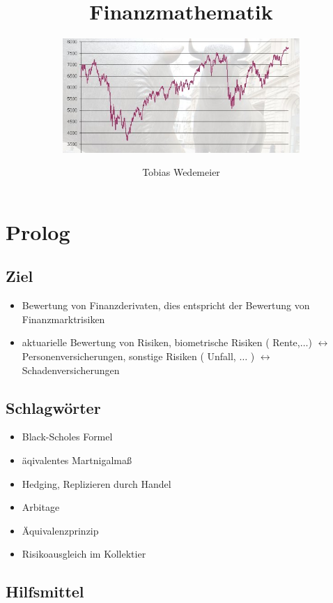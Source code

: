 \documentclass[a4paper, pagesize=pdftex, pdftex, twoside, headsepline, index=totoc,toc=listof, fontsize=10pt, cleardoublepage=empty, headinclude, DIV=13, BCOR=13mm]{scrartcl}
\author{Tobias Wedemeier}
\title{Finanzmathematik}
\subtitle{\includegraphics[width=9cm]{Bilder/boerse.jpg}}
\begin{document}
\maketitle
\thispagestyle{empty}
\newpage


\tableofcontents
\cleardoubleoddemptypage %

\setcounter{page}{1}

\section*{Prolog}  %
\label{sec:prolog}

\subsection*{Ziel} %
\label{sub:ziel}

\begin{itemize}
	\item Bewertung von Finanzderivaten, dies entspricht der Bewertung von Finanzmarktrisiken
	\item aktuarielle Bewertung von Risiken, biometrische Risiken ( Rente,$\dots$) $\leftrightarrow$ Personenversicherungen,
		sonstige Risiken ( Unfall, $\dots$ ) $\leftrightarrow$ Schadenversicherungen
\end{itemize}

\subsection*{Schlagwörter} %
\label{sub: schlagwörter}

\begin{itemize}
	\item Black-Scholes Formel
	\item äqivalentes Martnigalmaß
	\item Hedging, Replizieren durch Handel
	\item Arbitage
	\item Äquivalenzprinzip
	\item Risikoausgleich im Kollektier
\end{itemize}

\subsection*{Hilfsmittel} %
\label{sub:hilfsmittel}
\end{document}
